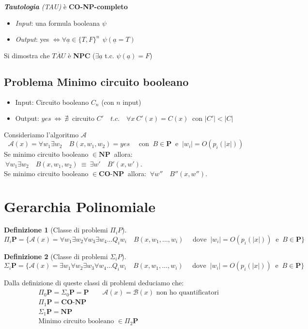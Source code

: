 \documentclass[a4paper]{article}
\theoremstyle{definition}
\newtheorem{definit}{Definizione}[subsection]
\newcommand{\p}{\mathbf{P}}
\newcommand{\np}{\mathbf{NP}}
\newcommand{\conp}{\mathbf{CO}\text{-}\mathbf{NP}}
\newcommand{\alg}[1]{\mathcal{#1}}
\begin{document}
 	\noindent
 	\textit{\textbf{Tautologia} (TAU)} è \textbf{CO-NP-completo}
 	\begin{itemize}
 		\item \textit{Input}: una formula booleana $\psi$
 		\item \textit{Output}: yes $\Leftrightarrow \forall \underline{a} \in \{ T, F \}^n ~~ \psi(\underline{a} = T)$
 	\end{itemize}
 	
 	\noindent
 	Si dimostra che $\overline{TAU}$ è \textbf{NPC} ($\exists \underline{a}$ t.c. $\psi(\underline{a}) = F$)
 		
	 \subsection{Problema Minimo circuito booleano}
		 \begin{itemize}
		 	\item Input: Circuito booleano $ C_n $ (con $ n $ input)
		 	\item Output: $ yes \ \Leftrightarrow \ \nexists \ $ circuito $ C' \quad t.c.\quad \forall x \ C'(x) = C(x) \ $ con  $ \vert C'\vert < \vert C \vert $ 
		 \end{itemize}
		 Consideriamo l'algoritmo $ \alg{A} $
		\[
			\alg{A}(x) = \forall w_1 \exists w_2 \quad B(x, w_1, w_2) = yes \quad \text{ con }\ B\in \p \
			\text{ e } \ \vert w_i \vert = O(p_i(\vert x \vert))
		\]
		Se minimo circuito booleano $ \in \np \ $ allora: $ \ \forall w_1 \exists w_2 \quad B(x, w_1, w_2) \ \equiv \ 
		\exists w'\quad B'(x, w') $.\\
		Se minimo circuito booleano $ \in \conp \ $ allora: $\ \forall w''\quad B''(x, w'') $.
		
	\section{Gerarchia Polinomiale}
		\begin{definit}[Classe di problemi $ \Pi_i P $]
			\[
				\Pi_i \p = \{ \alg{A}(x) = \forall w_1\exists w_2 \forall w_3 \exists w_4 \dots Q_i w_i \quad B(x, w_1, \dots, w_i) \quad \text{ dove } \ \vert w_i \vert = O(p_i(\vert x \vert)) \ \text{ e } \ B\in\p \}
			\]
		\end{definit}
		
		\begin{definit}[Classe di problemi $ \Sigma_i P $]
			\[
			\Sigma_i \p = \{ \alg{A}(x) = \exists w_1\forall w_2 \exists w_3 \forall w_4 \dots Q_i w_i \quad B(x, w_1, \dots, w_i) \quad \text{ dove } \ \vert w_i \vert = O(p_i(\vert x \vert)) \ \text{ e } \ B\in\p \}
			\]
		\end{definit}
		Dalla definizione di queste classi di problemi deduciamo che:
		\begin{align*}
			&\Pi_0 \p = \Sigma_0 \p = \p \qquad \alg{A}(x) = \alg{B}(x) \text{ non ho quantificatori} \\
			&\Pi_1 \p = \conp \\
			&\Sigma_1 \p = \np \\
			&\text{Minimo circuito booleano } \in \Pi_2 \p
		\end{align*}
		
\end{document}
